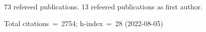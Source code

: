 73 refereed publications. 13 refeered publications as first author.

Total citations~=~2754; h-index~=~28 (2022-08-05)